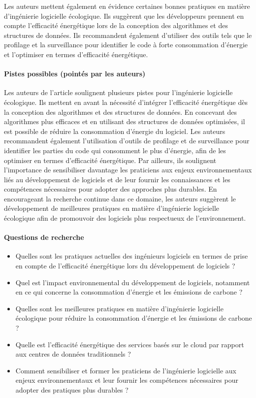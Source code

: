Les auteurs mettent également en évidence certaines bonnes pratiques en matière d'ingénierie logicielle écologique. Ils suggèrent que les développeurs prennent en compte l'efficacité énergétique lors de la conception des algorithmes et des structures de données. Ils recommandent également d'utiliser des outils tels que le profilage et la surveillance pour identifier le code à forte consommation d'énergie et l'optimiser en termes d'efficacité énergétique.

\paragraph{Pistes possibles (pointés par les auteurs)}
Les auteurs de l'article soulignent plusieurs pistes pour l'ingénierie logicielle écologique. Ils mettent en avant la nécessité d'intégrer l'efficacité énergétique dès la conception des algorithmes et des structures de données. En concevant des algorithmes plus efficaces et en utilisant des structures de données optimisées, il est possible de réduire la consommation d'énergie du logiciel. Les auteurs recommandent également l'utilisation d'outils de profilage et de surveillance pour identifier les parties du code qui consomment le plus d'énergie, afin de les optimiser en termes d'efficacité énergétique. Par ailleurs, ils soulignent l'importance de sensibiliser davantage les praticiens aux enjeux environnementaux liés au développement de logiciels et de leur fournir les connaissances et les compétences nécessaires pour adopter des approches plus durables. En encourageant la recherche continue dans ce domaine, les auteurs suggèrent le développement de meilleures pratiques en matière d'ingénierie logicielle écologique afin de promouvoir des logiciels plus respectueux de l'environnement.

\paragraph{Questions de recherche}
\begin{itemize}
    \item Quelles sont les pratiques actuelles des ingénieurs logiciels en termes de prise en compte de l'efficacité énergétique lors du développement de logiciels ?
    \item Quel est l'impact environnemental du développement de logiciels, notamment en ce qui concerne la consommation d'énergie et les émissions de carbone ?
    \item Quelles sont les meilleures pratiques en matière d'ingénierie logicielle écologique pour réduire la consommation d'énergie et les émissions de carbone ?
    \item Quelle est l'efficacité énergétique des services basés sur le cloud par rapport aux centres de données traditionnels ?
    \item Comment sensibiliser et former les praticiens de l'ingénierie logicielle aux enjeux environnementaux et leur fournir les compétences nécessaires pour adopter des pratiques plus durables ?
\end{itemize}

